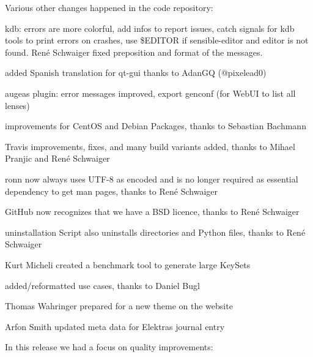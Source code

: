 Various other changes happened in the code repository\+:


\begin{DoxyItemize}
\item kdb\+: errors are more colorful, add infos to report issues, catch signals for {\ttfamily kdb} tools to print errors on crashes, use {\ttfamily \$\+E\+D\+I\+T\+OR} if {\ttfamily sensible-\/editor} and {\ttfamily editor} is not found. René Schwaiger fixed preposition and format of the messages.
\item added Spanish translation for qt-\/gui thanks to Adan\+GQ (@pixelead0)
\item augeas plugin\+: error messages improved, export genconf (for Web\+UI to list all lenses)
\item improvements for Cent\+OS and Debian Packages, thanks to Sebastian Bachmann
\item Travis improvements, fixes, and many build variants added, thanks to Mihael Pranjic and René Schwaiger
\item {\ttfamily ronn} now always uses U\+T\+F-\/8 as encoded and is no longer required as essential dependency to get man pages, thanks to René Schwaiger
\item Git\+Hub now recognizes that we have a B\+SD licence, thanks to René Schwaiger
\item uninstallation Script also uninstalls directories and Python files, thanks to René Schwaiger
\item Kurt Micheli created a benchmark tool to generate large Key\+Sets
\item added/reformatted use cases, thanks to Daniel Bugl
\item Thomas Wahringer prepared for a new theme on the website
\item Arfon Smith updated meta data for Elektra\textquotesingle{}s journal entry
\end{DoxyItemize}

In this release we had a focus on quality improvements\+:


